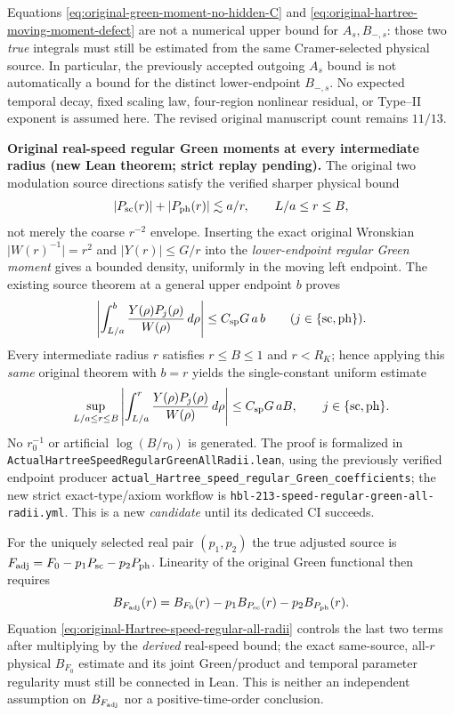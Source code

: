 \documentclass[11pt]{amsart}
\begin{document}
Equations \eqref{eq:original-green-moment-no-hidden-C} and
\eqref{eq:original-hartree-moving-moment-defect} are not a numerical
upper bound for $A_s,B_{-,s}$: those two \emph{true} integrals must
still be estimated from the same Cramer-selected physical source.
In particular, the previously accepted outgoing $A_s$ bound is not
automatically a bound for the distinct lower-endpoint $B_{-,s}$.
No expected temporal decay, fixed scaling law, four-region nonlinear
residual, or Type--II exponent is assumed here.  The revised original
manuscript count remains $11/13$.


\medskip
\noindent\textbf{Original real-speed regular Green moments at every intermediate
radius (new Lean theorem; strict replay pending).}
The original two modulation source directions satisfy the
verified sharper physical bound
\[
 |P_{\rm sc}(r)|+|P_{\rm ph}(r)|\lesssim a/r,
 \qquad L/a\le r\le B,
\]
not merely the coarse $r^{-2}$ envelope.  Inserting the exact original
Wronskian $\lvert W(r)^{-1}\rvert=r^2$ and
$\lvert Y(r)\rvert\le G/r$ into the \emph{lower-endpoint regular Green
moment} gives a bounded density, uniformly in the moving left endpoint.
The existing source theorem at a general upper endpoint $b$ proves
\[
 \left|\int_{L/a}^{b}\frac{Y(\rho)P_j(\rho)}
 {W(\rho)}\,d\rho\right|
 \le C_{\rm sp}G\,a\,b
 \qquad(j\in\{\mathrm{sc},\mathrm{ph}\}).
\]
Every intermediate radius $r$ satisfies $r\le B\le1$ and $r<R_K$;
hence applying this \emph{same} original theorem with $b=r$
yields the single-constant uniform estimate
\begin{equation}
 \sup_{L/a\le r\le B}
 \left|\int_{L/a}^{r}\frac{Y(\rho)P_j(\rho)}
 {W(\rho)}\,d\rho\right|
 \le C_{\rm sp}G\,a B,
 \qquad j\in\{\mathrm{sc},\mathrm{ph}\}.
 \label{eq:original-Hartree-speed-regular-all-radii}
\end{equation}
No $r_0^{-1}$ or artificial $\log(B/r_0)$ is generated.
The proof is formalized in
\texttt{ActualHartreeSpeedRegularGreenAllRadii.lean}, using the
previously verified endpoint producer
\texttt{actual\_Hartree\_speed\_regular\_Green\_coefficients};
the new strict exact-type/axiom workflow is
\texttt{hbl-213-speed-regular-green-all-radii.yml}.
This is a new \emph{candidate} until its dedicated CI succeeds.

For the uniquely selected real pair $(p_1,p_2)$ the true adjusted
source is $F_{\rm adj}=F_0-p_1P_{\rm sc}-p_2P_{\rm ph}$.
Linearity of the original Green functional then requires
\[
 B_{F_{\rm adj}}(r)=B_{F_0}(r)-
       p_1 B_{P_{\rm sc}}(r)-p_2 B_{P_{\rm ph}}(r).
\]
Equation \eqref{eq:original-Hartree-speed-regular-all-radii}
controls the last two terms after multiplying by the \emph{derived}
real-speed bound; the exact same-source, all-$r$ physical
$B_{F_0}$ estimate and its joint Green/product and temporal
parameter regularity must still be connected in Lean.  This is
neither an independent assumption on $B_{F_{\rm adj}}$ nor a
positive-time-order conclusion.
\end{document}

